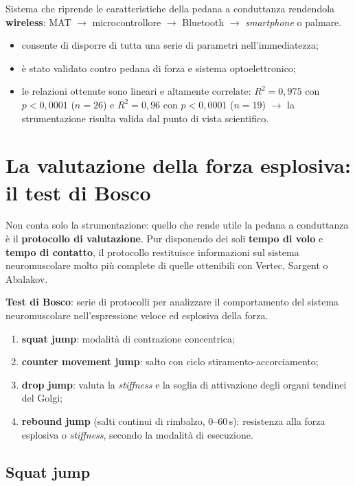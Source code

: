 Sistema che riprende le caratteristiche della pedana a conduttanza rendendola \textbf{wireless}:
MAT $\rightarrow$ microcontrollore $\rightarrow$ Bluetooth $\rightarrow$ \textit{smartphone} o
palmare.
\begin{itemize}
  \item consente di disporre di tutta una serie di parametri nell'immediatezza;
  \item è stato validato contro pedana di forza e sistema optoelettronico;
  \item le relazioni ottenute sono lineari e altamente correlate: $R^2 = 0,975$ con $p < 0,0001$
    ($n = 26$) e $R^2 = 0,96$ con $p < 0,0001$ ($n = 19$) $\rightarrow$ la strumentazione risulta
    valida dal punto di vista scientifico.
\end{itemize}

\section{La valutazione della forza esplosiva: il test di Bosco}

Non conta solo la strumentazione: quello che rende utile la pedana a conduttanza è il
  \textbf{protocollo di valutazione}. Pur disponendo dei soli \textbf{tempo di volo} e \textbf{tempo
  di contatto}, il protocollo restituisce informazioni sul sistema neuromuscolare molto più complete
  di quelle ottenibili con Vertec, Sargent o Abalakov.

\textbf{Test di Bosco}: serie di protocolli per analizzare il comportamento del sistema
  neuromuscolare nell'espressione veloce ed esplosiva della forza.
\begin{enumerate}
  \item \textbf{squat jump}: modalità di contrazione concentrica;
  \item \textbf{counter movement jump}: salto con ciclo stiramento-accorciamento;
  \item \textbf{drop jump}: valuta la \textit{stiffness} e la soglia di attivazione degli organi
    tendinei del Golgi;
  \item \textbf{rebound jump} (salti continui di rimbalzo, 0--60\,s): resistenza alla forza
    esplosiva o \textit{stiffness}, secondo la modalità di esecuzione.
\end{enumerate}

\subsection{Squat jump}


